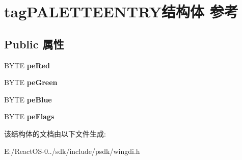 \hypertarget{structtag_p_a_l_e_t_t_e_e_n_t_r_y}{}\section{tag\+P\+A\+L\+E\+T\+T\+E\+E\+N\+T\+R\+Y结构体 参考}
\label{structtag_p_a_l_e_t_t_e_e_n_t_r_y}
\subsection*{Public 属性}
\begin{DoxyCompactItemize}
\item 
\mbox{\label{structtag_p_a_l_e_t_t_e_e_n_t_r_y_a3675ffdf8b989e4688e8ee2559405dec}} 
B\+Y\+TE {\bfseries pe\+Red}
\item 
\mbox{\label{structtag_p_a_l_e_t_t_e_e_n_t_r_y_ac7ca595245f12aa047119c9f1e220851}} 
B\+Y\+TE {\bfseries pe\+Green}
\item 
\mbox{\label{structtag_p_a_l_e_t_t_e_e_n_t_r_y_a7d587c15aef2fee65656a7866289fd68}} 
B\+Y\+TE {\bfseries pe\+Blue}
\item 
\mbox{\label{structtag_p_a_l_e_t_t_e_e_n_t_r_y_a531cc6f5d88e05cd05ef20ad37f490e8}} 
B\+Y\+TE {\bfseries pe\+Flags}
\end{DoxyCompactItemize}


该结构体的文档由以下文件生成\+:\begin{DoxyCompactItemize}
\item 
E\+:/\+React\+O\+S-\/0../sdk/include/psdk/wingdi.\+h\end{DoxyCompactItemize}
